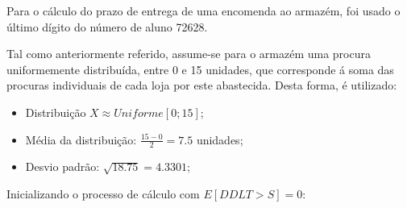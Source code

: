 Para o cálculo do prazo de entrega de uma encomenda ao armazém, foi usado
o último dígito do número de aluno 72628.

Tal como anteriormente referido, assume-se para o armazém uma procura
uniformemente distribuída, entre 0 e 15 unidades, que corresponde á soma das
procuras individuais de cada loja por este abastecida. Desta forma, é utilizado:

\begin{itemize}
	\item Distribuição $X \approx Uniforme[0;15]$;
	\item Média da distribuição: $\frac{15 - 0}{2}= 7.5$ unidades;
	\item Desvio padrão: $\sqrt{18.75}= 4.3301$;
\end{itemize}

Inicializando o processo de cálculo com $E [DDLT > S ] = 0$:

